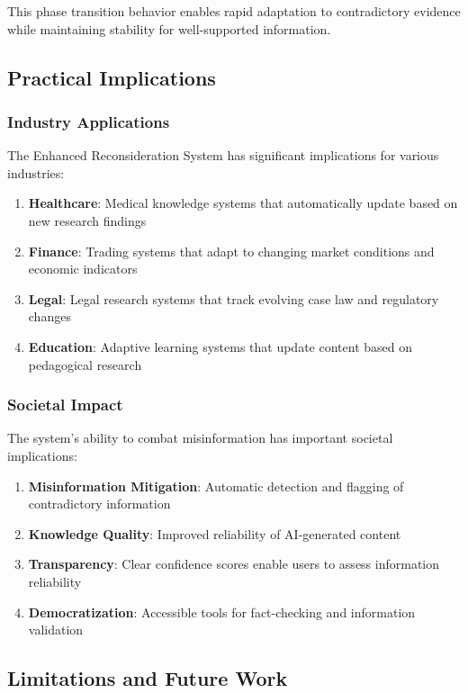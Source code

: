 \documentclass[12pt,a4paper]{article}
\begin{document}
This phase transition behavior enables rapid adaptation to contradictory evidence while maintaining stability for well-supported information.

\subsection{Practical Implications}

\subsubsection{Industry Applications}

The Enhanced Reconsideration System has significant implications for various industries:

\begin{enumerate}
\item \textbf{Healthcare}: Medical knowledge systems that automatically update based on new research findings
\item \textbf{Finance}: Trading systems that adapt to changing market conditions and economic indicators
\item \textbf{Legal}: Legal research systems that track evolving case law and regulatory changes
\item \textbf{Education}: Adaptive learning systems that update content based on pedagogical research
\end{enumerate}

\subsubsection{Societal Impact}

The system's ability to combat misinformation has important societal implications:

\begin{enumerate}
\item \textbf{Misinformation Mitigation}: Automatic detection and flagging of contradictory information
\item \textbf{Knowledge Quality}: Improved reliability of AI-generated content
\item \textbf{Transparency}: Clear confidence scores enable users to assess information reliability
\item \textbf{Democratization}: Accessible tools for fact-checking and information validation
\end{enumerate}

\subsection{Limitations and Future Work}
\end{document}
